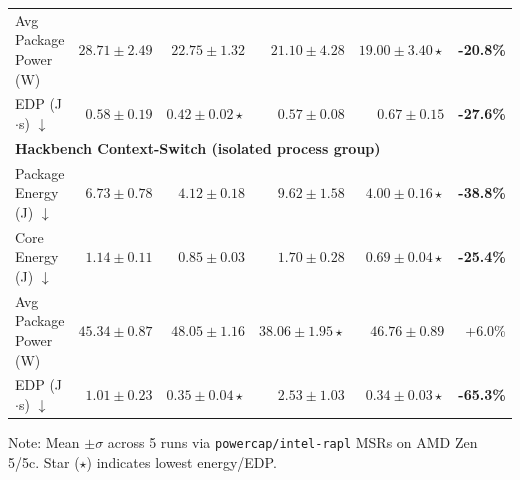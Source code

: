 \documentclass[letterpaper,twocolumn,10pt]{article}
\begin{document}
\begin{table}[t!]
{\begin{tabular}{lrrrrr}
Avg Package Power (W) & $28.71 \pm 2.49$ & $22.75 \pm 1.32$ & $21.10 \pm 4.28$ & $\mathbf{19.00 \pm 3.40} \star$ & \textbf{-20.8\%} \\
EDP (J$\cdot$s) $\downarrow$ & $0.58 \pm 0.19$ & $\mathbf{0.42 \pm 0.02} \star$ & $0.57 \pm 0.08$ & $0.67 \pm 0.15$ & \textbf{-27.6\%} \\
\midrule
\multicolumn{6}{l}{\textbf{Hackbench Context-Switch (isolated process group)}} \\
Package Energy (J) $\downarrow$ & $6.73 \pm 0.78$ & $4.12 \pm 0.18$ & $9.62 \pm 1.58$ & $\mathbf{4.00 \pm 0.16} \star$ & \textbf{-38.8\%} \\
Core Energy (J) $\downarrow$ & $1.14 \pm 0.11$ & $0.85 \pm 0.03$ & $1.70 \pm 0.28$ & $\mathbf{0.69 \pm 0.04} \star$ & \textbf{-25.4\%} \\
Avg Package Power (W) & $45.34 \pm 0.87$ & $48.05 \pm 1.16$ & $\mathbf{38.06 \pm 1.95} \star$ & $46.76 \pm 0.89$ & +6.0\% \\
EDP (J$\cdot$s) $\downarrow$ & $1.01 \pm 0.23$ & $\mathbf{0.35 \pm 0.04} \star$ & $2.53 \pm 1.03$ & $\mathbf{0.34 \pm 0.03} \star$ & \textbf{-65.3\%} \\
\bottomrule
\end{tabular}%
}
\vspace{0.2ex}
\raggedright \tiny Note: Mean $\pm \sigma$ across 5 runs via \texttt{powercap/intel-rapl} MSRs on AMD Zen 5/5c. Star ($\star$) indicates lowest energy/EDP.
\end{table}
\end{document}
